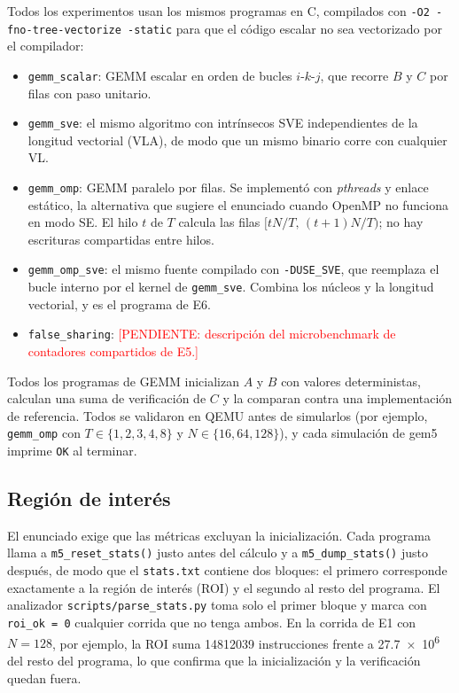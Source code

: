 \documentclass[journal]{IEEEtran}
\newcommand{\pendiente}[1]{\textcolor{red}{[PENDIENTE: #1]}}
\begin{document}
Todos los experimentos usan los mismos programas en C, compilados con
\texttt{-O2 -fno-tree-vectorize -static} para que el código escalar no
sea vectorizado por el compilador:
\begin{itemize}
  \item \texttt{gemm\_scalar}: GEMM escalar en orden de bucles
        $i$-$k$-$j$, que recorre $B$ y $C$ por filas con paso unitario.
  \item \texttt{gemm\_sve}: el mismo algoritmo con intrínsecos SVE
        independientes de la longitud vectorial (VLA), de modo que un
        mismo binario corre con cualquier VL.
  \item \texttt{gemm\_omp}: GEMM paralelo por filas. Se implementó con
        \emph{pthreads} y enlace estático, la alternativa que sugiere el
        enunciado cuando OpenMP no funciona en modo SE. El hilo $t$ de
        $T$ calcula las filas $[tN/T,\,(t+1)N/T)$; no hay escrituras
        compartidas entre hilos.
  \item \texttt{gemm\_omp\_sve}: el mismo fuente compilado con
        \texttt{-DUSE\_SVE}, que reemplaza el bucle interno por el
        kernel de \texttt{gemm\_sve}. Combina los núcleos y la longitud
        vectorial, y es el programa de E6.
  \item \texttt{false\_sharing}: \pendiente{descripción del
        microbenchmark de contadores compartidos de E5.}
\end{itemize}

Todos los programas de GEMM inicializan $A$ y $B$ con valores
deterministas, calculan una suma de verificación de $C$ y la comparan
contra una implementación de referencia. Todos se validaron en QEMU
antes de simularlos (por ejemplo, \texttt{gemm\_omp} con
$T \in \{1{,}2,3{,}4,8\}$ y $N \in \{16, 64, 128\}$), y cada simulación de
gem5 imprime \texttt{OK} al terminar.

\subsection{Región de interés}

El enunciado exige que las métricas excluyan la inicialización. Cada
programa llama a \texttt{m5\_reset\_stats()} justo antes del cálculo y
a \texttt{m5\_dump\_stats()} justo después, de modo que el
\texttt{stats.txt} contiene dos bloques: el primero corresponde
exactamente a la región de interés (ROI) y el segundo al resto del
programa. El analizador \texttt{scripts/parse\_stats.py} toma solo el
primer bloque y marca con \texttt{roi\_ok = 0} cualquier corrida que no
tenga ambos. En la corrida de E1 con $N=128$, por ejemplo, la ROI suma
\num{14812039} instrucciones frente a \num{27.7e6} del resto del
programa, lo que confirma que la inicialización y la verificación
quedan fuera.
\end{document}
